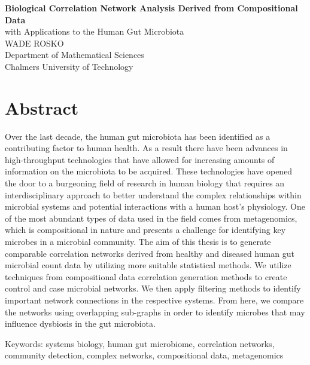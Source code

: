
\textbf{Biological Correlation Network Analysis Derived from Compositional Data}\\
with Applications to the Human Gut Microbiota\\
WADE ROSKO\\
Department of Mathematical Sciences\\
Chalmers University of Technology \setlength{\parskip}{0.5cm}

\thispagestyle{plain}			%
\setlength{\parskip}{0pt plus 1.0pt}
\section*{Abstract}
Over the last decade, the human gut microbiota has been identified as a contributing factor to human health. As a result there have been advances in high-throughput technologies that have allowed for increasing amounts of information on the microbiota to be acquired. These technologies have opened the door to a burgeoning field of research in human biology that requires an interdisciplinary approach to better understand the complex relationships within microbial systems and potential interactions with a human host's physiology. One of the most abundant types of data used in the field comes from metagenomics, which is compositional in nature and presents a challenge for identifying key microbes in a microbial community. The aim of this thesis is to generate comparable correlation networks derived from healthy and diseased human gut microbial count data by utilizing more suitable statistical methods. We utilize techniques from compositional data correlation generation methods to create control and case microbial networks. We then apply filtering methods to identify important network connections in the respective systems. From here, we compare the networks using overlapping sub-graphs in order to identify microbes that may influence dysbiosis in the gut microbiota. %

\vfill
Keywords: systems biology, human gut microbiome, correlation networks, community detection, complex networks, compositional data, metagenomics

\newpage				%
\thispagestyle{empty}
\mbox{}
